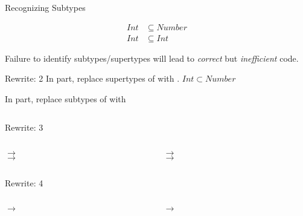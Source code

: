 \begin{frame}{Recognizing Subtypes}
  \centering

  \begin{align*}
    Int&\subseteq Number\\
    Int&\subseteq Int
  \end{align*}

  \scalebox{0.8}{}


  Failure to identify subtypes/supertypes will lead to \emph{correct} but \emph{inefficient} code.
\end{frame}



\begin{frame}{Rewrite: 2}
  In  part, replace supertypes of  with .  $Int\subset Number$
  
  In  part, replace subtypes of  with 

  \begin{columns}
    \begin{column}{0.5\textwidth}
      \usebox\typecaseBbox
    \end{column}
    \begin{column}{0.5\textwidth}  %
      \usebox\typecaseChbox
    \end{column}    
  \end{columns}
\end{frame}



\begin{frame}{Rewrite: 3}
  \begin{columns}
    \begin{column}{0.5\textwidth}
       $\to$ \\
       $\to$ 
      
      \usebox\typecaseCbox
    \end{column}
    \begin{column}{0.5\textwidth}  %
       $\to$ \\
       $\to$ 

      \usebox\typecaseDhbox
    \end{column}    
  \end{columns}
\end{frame}

\begin{frame}{Rewrite: 4}
  \begin{columns}
    \begin{column}{0.5\textwidth}
       $\to$ 
      
      \usebox\typecaseDbox
    \end{column}
    \begin{column}{0.5\textwidth}  %
       $\to$ 

      \usebox\typecaseEhbox
    \end{column}    
  \end{columns}
\end{frame}

